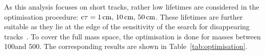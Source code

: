 As this analysis focuses on short tracks, rather low lifetimes are considered in the optimisation procedure: $\text{c}\tau=1\,\text{cm},\,10\,\text{cm},\,50\,\text{cm}$.
These lifetimes are further suitable as they lie at the edge of the sensitivity of the search for disappearing tracks~\cite{bib:CMS:DT_8TeV}.
To cover the full mass space, the optimisation is done for masses between 100\gev and 500\gev.
The corresponding results are shown in Table~\ref{tab:optimisation}.
\renewcommand{\arraystretch}{1.5}
\begin{table}[!h]
\centering
\caption{Optimal \pt and \ias selection cuts and the corresponding minimum cross section $\sigma_{\text{min}}$ that can be discovered with 5$\sigma$ significance for different signal models.
         For some signal samples, an optimisation result is not available due to the limited size of these samples.}
\label{tab:optimisation}
\end{table}
